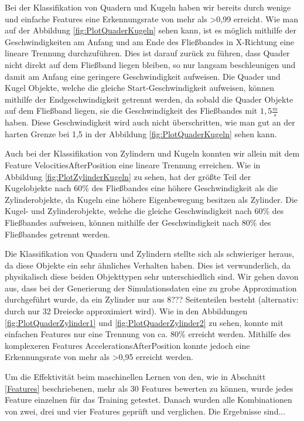 Bei der Klassifikation von Quadern und Kugeln haben wir bereits durch wenige und einfache Features eine Erkennungsrate von mehr als \textgreater0,99 erreicht. Wie man auf der Abbildung \ref{fig:PlotQuaderKugeln} sehen kann, ist es möglich mithilfe der Geschwindigkeiten am Anfang und am Ende des Fließbandes in X-Richtung eine lineare Trennung durchzuführen. Dies ist darauf zurück zu führen, dass Quader nicht direkt auf dem Fließband liegen bleiben, so nur langsam beschleunigen und damit am Anfang eine geringere Geschwindigkeit aufweisen. Die Quader und Kugel Objekte, welche die gleiche Start-Geschwindigkeit aufweisen, können mithilfe der Endgeschwindigkeit getrennt werden, da sobald die Quader Objekte auf dem Fließband liegen, sie die Geschwindigkeit des Fließbandes mit $1,5 \frac{m}{s}$ haben. Diese Geschwindigkeit wird auch nicht überschritten, wie man gut an der harten Grenze bei 1,5 in der Abbildung \ref{fig:PlotQuaderKugeln} sehen kann. 

Auch bei der Klassifikation von Zylindern und Kugeln konnten wir allein mit dem Feature VelocitiesAfterPosition eine lineare Trennung erreichen. Wie in Abbildung \ref{fig:PlotZylinderKugeln} zu sehen, hat der größte Teil der Kugelobjekte nach 60\% des Fließbandes eine höhere Geschwindigkeit als die Zylinderobjekte, da Kugeln eine höhere Eigenbewegung besitzen als Zylinder. Die Kugel- und Zylinderobjekte, welche die gleiche Geschwindigkeit nach 60\% des Fließbandes aufweisen, können mithilfe der Geschwindigkeit nach 80\% des Fließbandes getrennt werden.

Die Klassifikation von Quadern und Zylindern stellte sich als schwieriger heraus, da diese Objekte ein sehr ähnliches Verhalten haben. Dies ist verwunderlich, da physikalisch diese beiden Objekttypen sehr unterschiedlich sind. Wir gehen davon aus, dass bei der Generierung der Simulationsdaten eine zu grobe Approximation durchgeführt wurde, da ein Zylinder nur aus 8??? Seitenteilen besteht (alternativ: durch nur 32 Dreiecke approximiert wird). Wie in den Abbildungen \ref{fig:PlotQuaderZylinder1} und \ref{fig:PlotQuaderZylinder2} zu sehen, konnte mit einfachen Features nur eine Trennung von ca. 80\% erreicht werden. Mithilfe des komplexeren Features AccelerationsAfterPosition konnte jedoch eine  Erkennungsrate von mehr als \textgreater0,95 erreicht werden.

Um die Effektivität beim maschinellen Lernen von den, wie in Abschnitt \ref{Features} beschriebenen, mehr als 30  Features bewerten zu können, wurde jedes Feature einzelnen für das Training getestet. Danach wurden alle Kombinationen von zwei, drei und vier Features geprüft und verglichen. Die Ergebnisse sind...






